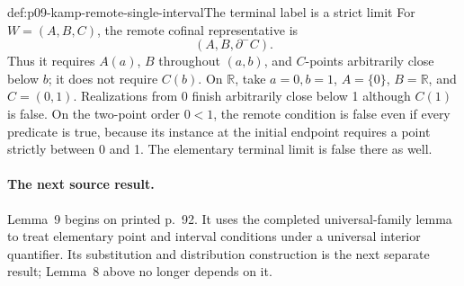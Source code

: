 \begin{hbexample}{def:p09-kamp-remote-single-interval}{The terminal label is a strict limit}
For \(W=(A,B,C)\), the remote cofinal representative is
\[
                      (A,B,\partial^-C).
\]
Thus it requires \(A(a)\), \(B\) throughout \((a,b)\),
and \(C\)-points arbitrarily close below \(b\); it does not
require \(C(b)\). On \(\mathbb R\), take \(a=0,b=1\),
\(A=\{0\}\), \(B=\mathbb R\), and \(C=(0,1)\).
Realizations from 0 finish arbitrarily close below 1 although
\(C(1)\) is false. On the two-point order \(0<1\), the
remote condition is false even if every predicate is true, because
its instance at the initial endpoint requires a point strictly between
0 and 1. The elementary terminal limit is false there as well.
\end{hbexample}

\paragraph{The next source result.}
Lemma~9 begins on printed p.~92. It uses the completed universal-family
lemma to treat elementary point and interval conditions under a universal
interior quantifier. Its substitution and distribution construction is
the next separate result; Lemma~8 above no longer depends on it.
